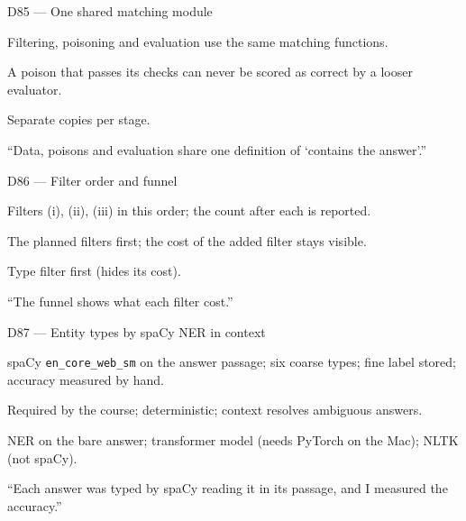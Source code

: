 \documentclass[11pt,a4paper]{report}
\begin{document}
\begin{decisionbox}{D85 --- One shared matching module}
\begin{description}[nosep, leftmargin=0pt]
  \item[Decision.] Filtering, poisoning and evaluation use the same matching functions.
  \item[Why.] A poison that passes its checks can never be scored as correct by a looser evaluator.
  \item[Alternatives.] Separate copies per stage.
  \item[Interview line.] ``Data, poisons and evaluation share one definition of `contains the answer'.''
\end{description}
\end{decisionbox}

\begin{decisionbox}{D86 --- Filter order and funnel}
\begin{description}[nosep, leftmargin=0pt]
  \item[Decision.] Filters (i), (ii), (iii) in this order; the count after each is reported.
  \item[Why.] The planned filters first; the cost of the added filter stays visible.
  \item[Alternatives.] Type filter first (hides its cost).
  \item[Interview line.] ``The funnel shows what each filter cost.''
\end{description}
\end{decisionbox}

\begin{decisionbox}{D87 --- Entity types by spaCy NER in context}
\begin{description}[nosep, leftmargin=0pt]
  \item[Decision.] spaCy \texttt{en\_core\_web\_sm} on the answer passage; six coarse types; fine label stored; accuracy measured by hand.
  \item[Why.] Required by the course; deterministic; context resolves ambiguous answers.
  \item[Alternatives.] NER on the bare answer; transformer model (needs PyTorch on the Mac); NLTK (not spaCy).
  \item[Interview line.] ``Each answer was typed by spaCy reading it in its passage, and I measured the accuracy.''
\end{description}
\end{decisionbox}
\end{document}
